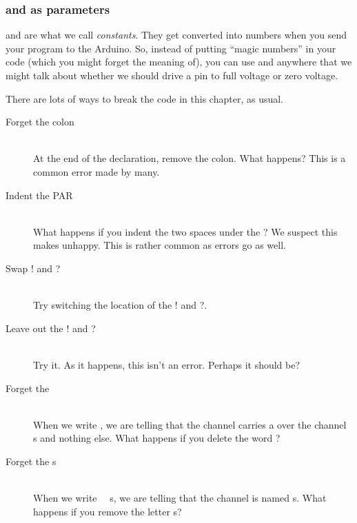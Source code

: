 \subsubsection{\LOW and \HIGH as parameters}
\LOW and \HIGH are what we call {\em constants}. They get converted into numbers when you send your program to the Arduino. So, instead of putting ``magic numbers'' in your code (which you might forget the meaning of), you can use \LOW and \HIGH anywhere that we might talk about whether we should drive a pin to full voltage or zero voltage.

\BREAKAGE
There are lots of ways to break the code in this chapter, as usual.

\begin{description}		
	\item[Forget the colon]\ \\
	At the end of the \CHANnel declaration, remove the colon. What happens? This is a common error made by many.
	\item[Indent the PAR]\ \\
	What happens if you indent the \PAR two spaces under the \CHAN? We suspect this makes \plumbing unhappy. This is rather common as errors go as well.

	\item[Swap {\code !} and {\code ?}]\ \\
	Try switching the location of the {\code !} and {\code ?}. 
	
	\item[Leave out the {\code !} and {\code ?}]\ \\
	Try it. As it happens, this isn't an error. Perhaps it should be?
	
	\item[Forget the \SIGNAL]\ \\
	When we write \CHAN {}, we are telling \plumbing that the channel carries a \SIGNAL over the channel {\code s} and nothing else. What happens if you delete the word \SIGNAL?
	
	\item[Forget the {\code s}]\ \\
	When we write \CHAN \ \SIGNAL \ {\code s}, we are telling \plumbing that the channel is named {\code s}. What happens if you remove the letter {\code s}?
		
\end{description}


	
	